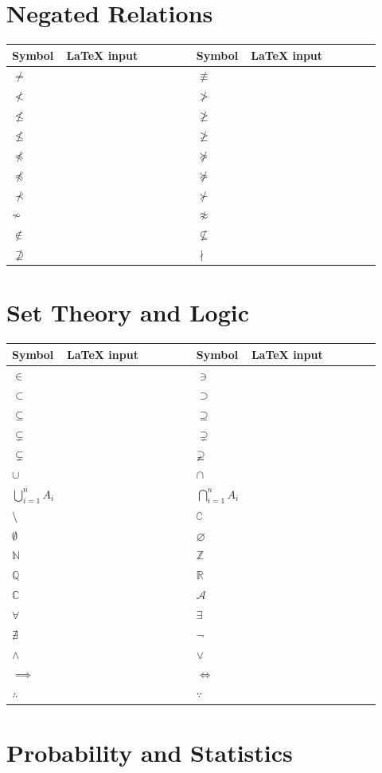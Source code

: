 \documentclass[10pt]{article}
\newcommand{\code}[1]{\texttt{\detokenize{#1}}}
\newcommand{\srow}[4]{$#1$ & \code{#2} & $#3$ & \code{#4}\\}
\newenvironment{symtable}
{\small\begin{longtable}{
  >{\centering\arraybackslash}p{0.12\linewidth}
  >{\raggedright\arraybackslash}p{0.34\linewidth}
  >{\centering\arraybackslash}p{0.12\linewidth}
  >{\raggedright\arraybackslash}p{0.34\linewidth}}
  \toprule
  \textbf{Symbol} & \textbf{LaTeX input} &
  \textbf{Symbol} & \textbf{LaTeX input}\\
  \midrule
  \endhead}
{\bottomrule\end{longtable}}
\begin{document}
\section*{Negated Relations}

\begin{symtable}
\srow{\neq}{\neq}{\not\equiv}{\not\equiv}
\srow{\nless}{\nless}{\ngtr}{\ngtr}
\srow{\nleq}{\nleq}{\ngeq}{\ngeq}
\srow{\nleqslant}{\nleqslant}{\ngeqslant}{\ngeqslant}
\srow{\npreceq}{\npreceq}{\nsucceq}{\nsucceq}
\srow{\not\preccurlyeq}{\not\preccurlyeq}{\not\succcurlyeq}{\not\succcurlyeq}
\srow{\nprec}{\nprec}{\nsucc}{\nsucc}
\srow{\not\sim}{\not\sim}{\not\approx}{\not\approx}
\srow{\notin}{\notin}{\nsubseteq}{\nsubseteq}
\srow{\nsupseteq}{\nsupseteq}{\nmid}{\nmid}
\end{symtable}

\section*{Set Theory and Logic}

\begin{symtable}
\srow{\in}{\in}{\ni}{\ni}
\srow{\subset}{\subset}{\supset}{\supset}
\srow{\subseteq}{\subseteq}{\supseteq}{\supseteq}
\srow{\subsetneq}{\subsetneq}{\supsetneq}{\supsetneq}
\srow{\varsubsetneq}{\varsubsetneq}{\varsupsetneq}{\varsupsetneq}
\srow{\cup}{\cup}{\cap}{\cap}
\srow{\bigcup_{i=1}^n A_i}{\bigcup_{i=1}^n A_i}{\bigcap_{i=1}^n A_i}{\bigcap_{i=1}^n A_i}
\srow{\setminus}{\setminus}{\complement}{\complement}
\srow{\emptyset}{\emptyset}{\varnothing}{\varnothing}
\srow{\mathbb{N}}{\mathbb{N}}{\mathbb{Z}}{\mathbb{Z}}
\srow{\mathbb{Q}}{\mathbb{Q}}{\mathbb{R}}{\mathbb{R}}
\srow{\mathbb{C}}{\mathbb{C}}{\mathcal{A}}{\mathcal{A}}
\srow{\forall}{\forall}{\exists}{\exists}
\srow{\nexists}{\nexists}{\neg}{\neg}
\srow{\land}{\land}{\lor}{\lor}
\srow{\implies}{\implies}{\iff}{\iff}
\srow{\therefore}{\therefore}{\because}{\because}
\end{symtable}

\section*{Probability and Statistics}
\end{document}
